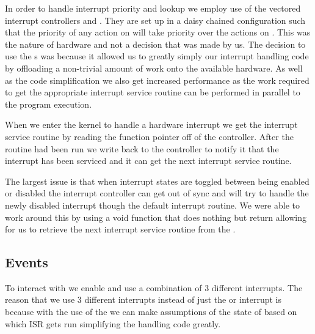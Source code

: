 \documentclass[pdftex,10pt,a4paper]{article}
\begin{document}
In order to handle interrupt priority and lookup we employ use of the vectored
interrupt controllers  and . They are set up in a daisy
chained configuration such that the priority of any action on  will
take priority over the actions on . This was the nature of hardware
and not a decision that was made by us. The decision to use the s was
because it allowed us to greatly simply our interrupt handling code by
offloading a non-trivial amount of work onto the available hardware. As well
as the code simplification we also get increased performance as the work
required to get the appropriate interrupt service routine can be performed in
parallel to the program execution.

When we enter the kernel to handle a hardware interrupt we get the interrupt
service routine by reading the function pointer off of the 
controller. After the routine had been run we write back to the controller to
notify it that the interrupt has been serviced and it can get the next
interrupt service routine.

The largest issue is that when interrupt states are toggled between being
enabled or disabled the interrupt controller can get out of sync and will try
to handle the newly disabled interrupt though the default interrupt routine.
We were able to work around this by using a void function that does nothing but
return allowing for us to retrieve the next interrupt service routine from the
.

\subsection*{ Events}
To interact with  we enable and use a combination of 3 different
interrupts. The reason that we use 3 different interrupts instead of just the
 or interrupt is because with the use of the  we can make
assumptions of the state of  based on which ISR gets run simplifying
the  handling code greatly.
\end{document}
